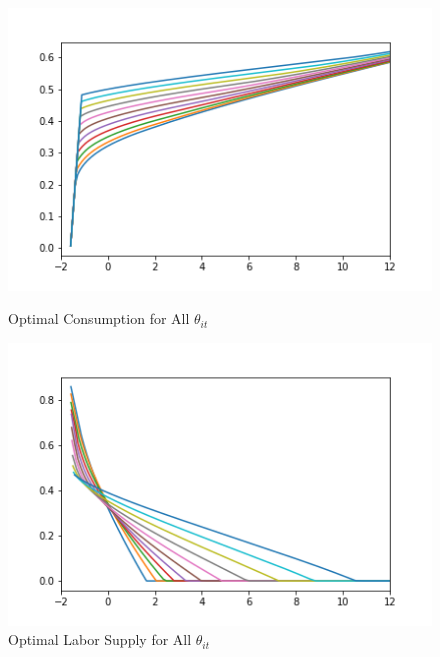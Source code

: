 \documentclass[./GL2017.tex]{subfiles}
\begin{document}
\begin{figure}[h]
\centerline{\includegraphics[width=6in]{Figures/Figure3.png}}
\label{fig:Figure3}
\caption{Optimal Consumption for All $\theta_{it}$}
\centerline{\includegraphics[width=6in]{Figures/Figure4.png}}
\label{fig:Figure4}
\caption{Optimal Labor Supply for All $\theta_{it}$}
\end{figure}


\clearpage\vfill\eject

\onlyinsubfile{}
\end{document}

